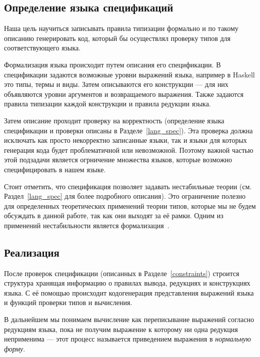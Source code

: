 \subsection*{Определение языка спецификаций}

Наша цель научиться записывать правила типизации формально и по такому описанию генерировать код, который бы осуществлял проверку типов для соответствующего языка.

Формализация языка происходит путем описания его спецификации. В спецификации задаются возможные уровни выражений языка, например в Haskell это типы, термы и виды. Затем описываются его конструкции --- для них объявляются уровни аргументов и возвращаемого выражения. Также задаются правила типизации каждой конструкции и правила редукции языка.

Затем описание проходит проверку на корректность (определение языка спецификации и проверки описаны в Разделе~\ref{lang_spec}). Эта проверка должна исключать как просто некорректно записанные языки, так и языки для которых генерация кода будет проблематичной или невозможной. Поэтому важной частью этой подзадачи является огрничение множества языков, которые возможно специфицировать в нашем языке.

Стоит отметить, что спецификация позволяет задавать нестабильные теории (см. Раздел~\ref{lang_spec} для более подробного описания). Это ограничение полезно для определенных теоретических применений теории типов, которые мы не будем обсуждать в данной работе, так как они выходят за её рамки. Одним из применений нестабильности является формализация~\cite{ncat:inf}.


\subsection*{Реализация}

После проверок спецификации (описанных в Разделе~\ref{constraints}) строится структура хранящая информацию о правилах вывода, редукциях и конструкциях языка. С её помощью происходит кодогенерация представления выражений языка и функций проверки типов и вычисления.

В дальнейшем мы понимаем вычисление как переписывание выражений согласно редукциям языка, пока не получим выражение к которому ни одна редукция неприменима --- этот процесс называется приведением выражения в \textit{нормальную форму}.

